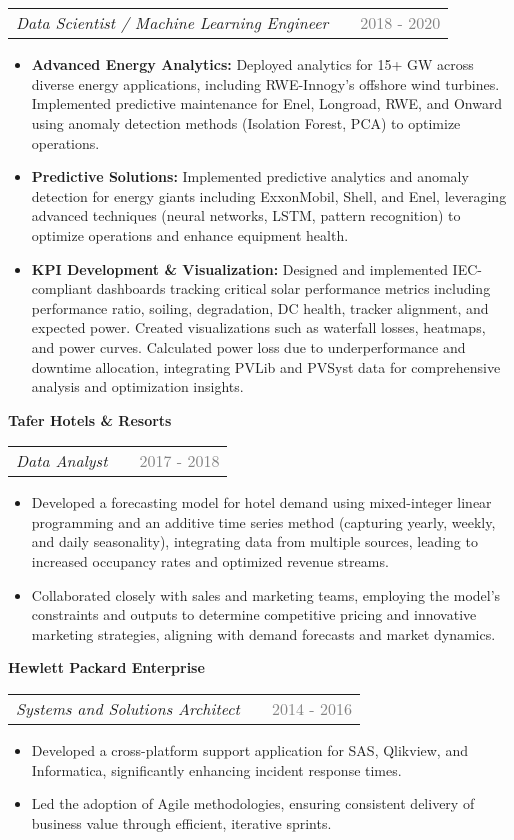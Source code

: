 \documentclass[a4paper,12pt]{article}
\makeatletter
\newenvironment{joblong}[3]
    {
    \noindent\textbf{\large #1}\\ %
    \begin{tabularx}{\linewidth}{@{}l X r@{}}
    \textit{#2} & &  {\textcolor{gray}{#3}} \\[3.75pt] %
    \end{tabularx}
    \begin{minipage}[t]{\linewidth}
    \begin{itemize}[nosep,after=\strut, leftmargin=1em, itemsep=3pt,label=--]
    }
    {
    \end{itemize}
    \end{minipage}    
    }
\makeatother
\begin{document}
\\
\begin{joblong}{}{Data Scientist / Machine Learning Engineer}{2018 - 2020}
    \item \textbf{Advanced Energy Analytics:} Deployed analytics for 15+ GW across diverse energy applications, including RWE-Innogy's offshore wind turbines. Implemented predictive maintenance for Enel, Longroad, RWE, and Onward using anomaly detection methods (Isolation Forest, PCA) to optimize operations.
    \item \textbf{Predictive Solutions:} Implemented predictive analytics and anomaly detection for energy giants including ExxonMobil, Shell, and Enel, leveraging advanced techniques (neural networks, LSTM, pattern recognition) to optimize operations and enhance equipment health.
    \item \textbf{KPI Development \& Visualization:} Designed and implemented IEC-compliant dashboards tracking critical solar performance metrics including performance ratio, soiling, degradation, DC health, tracker alignment, and expected power. Created visualizations such as waterfall losses, heatmaps, and power curves. Calculated power loss due to underperformance and downtime allocation, integrating PVLib and PVSyst data for comprehensive analysis and optimization insights.
\end{joblong}

\begin{joblong}{Tafer Hotels \&  Resorts }{Data Analyst}{2017 - 2018}
    \item Developed a forecasting model for hotel demand using mixed-integer linear programming and an additive time series method (capturing yearly, weekly, and daily seasonality), integrating data from multiple sources, leading to increased occupancy rates and optimized revenue streams.
    \item Collaborated closely with sales and marketing teams, employing the model's constraints and outputs to determine competitive pricing and innovative marketing strategies, aligning with demand forecasts and market dynamics.
\end{joblong}

\begin{joblong}{Hewlett Packard Enterprise}{Systems and Solutions Architect}{2014 - 2016}
    \item Developed a cross-platform support application for SAS, Qlikview, and Informatica, significantly enhancing incident response times.
    \item Led the adoption of Agile methodologies, ensuring consistent delivery of business value through efficient, iterative sprints.
\end{joblong}
    
\end{document}
